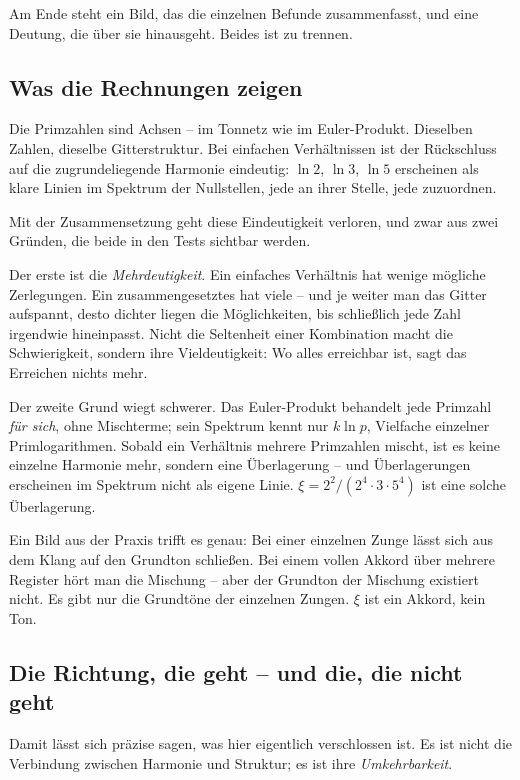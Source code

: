 Am Ende steht ein Bild, das die einzelnen Befunde zusammenfasst, und
eine Deutung, die \"uber sie hinausgeht. Beides ist zu trennen.

\subsection{Was die Rechnungen zeigen}

Die Primzahlen sind Achsen -- im Tonnetz wie im Euler-Produkt.
Dieselben Zahlen, dieselbe Gitterstruktur. Bei einfachen
Verh\"altnissen ist der R\"uckschluss auf die zugrundeliegende
Harmonie eindeutig: $\ln 2$, $\ln 3$, $\ln 5$ erscheinen als klare
Linien im Spektrum der Nullstellen, jede an ihrer Stelle, jede
zuzuordnen.

Mit der Zusammensetzung geht diese Eindeutigkeit verloren, und zwar
aus zwei Gr\"unden, die beide in den Tests sichtbar werden.

Der erste ist die \emph{Mehrdeutigkeit}. Ein einfaches Verh\"altnis hat
wenige m\"ogliche Zerlegungen. Ein zusammengesetztes hat viele -- und
je weiter man das Gitter aufspannt, desto dichter liegen die
M\"oglichkeiten, bis schlie\ss lich jede Zahl irgendwie hineinpasst.
Nicht die Seltenheit einer Kombination macht die Schwierigkeit,
sondern ihre Vieldeutigkeit: Wo alles erreichbar ist, sagt das
Erreichen nichts mehr.

Der zweite Grund wiegt schwerer. Das Euler-Produkt behandelt jede
Primzahl \emph{f\"ur sich}, ohne Mischterme; sein Spektrum kennt nur
$k\ln p$, Vielfache einzelner Primlogarithmen. Sobald ein Verh\"altnis
mehrere Primzahlen mischt, ist es keine einzelne Harmonie mehr,
sondern eine \"Uberlagerung -- und \"Uberlagerungen erscheinen im
Spektrum nicht als eigene Linie. $\xi = 2^2/(2^4\cdot3\cdot5^4)$ ist
eine solche \"Uberlagerung.

Ein Bild aus der Praxis trifft es genau: Bei einer einzelnen Zunge
l\"asst sich aus dem Klang auf den Grundton schlie\ss en. Bei einem
vollen Akkord \"uber mehrere Register h\"ort man die Mischung -- aber
der Grundton der Mischung existiert nicht. Es gibt nur die Grundt\"one
der einzelnen Zungen. $\xi$ ist ein Akkord, kein Ton.

\subsection{Die Richtung, die geht -- und die, die nicht geht}

Damit l\"asst sich pr\"azise sagen, was hier eigentlich verschlossen
ist. Es ist nicht die Verbindung zwischen Harmonie und Struktur; es
ist ihre \emph{Umkehrbarkeit}.

